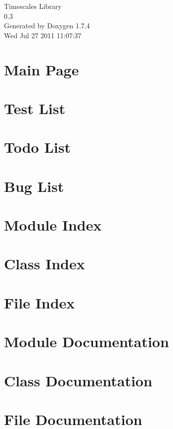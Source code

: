 \documentclass[letterpaper]{article}
\begin{document}
\hypersetup{pageanchor=false}
\begin{titlepage}
\vspace*{7cm}
\begin{center}
{\Large Timescales Library \\[1ex]\large 0.3 }\\
\vspace*{1cm}
{\large Generated by Doxygen 1.7.4}\\
\vspace*{0.5cm}
{\small Wed Jul 27 2011 11:07:37}\\
\end{center}
\end{titlepage}
\tableofcontents
{}
\hypersetup{pageanchor=true}
\section{Main Page}
\label{index}\hypertarget{index}{}
\section{Test List}
\label{test}
\hypertarget{test}{}

\section{Todo List}
\label{todo}
\hypertarget{todo}{}

\section{Bug List}
\label{bug}
\hypertarget{bug}{}

\section{Module Index}

\section{Class Index}

\section{File Index}

\section{Module Documentation}





\section{Class Documentation}

\section{File Documentation}















\printindex
\end{document}
